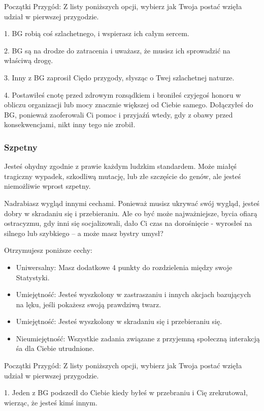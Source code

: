 Początki Przygód: Z listy poniższych opcji, wybierz jak Twoja postać wzięła udział w pierwszej przygodzie.

1. BG robią coś szlachetnego, i wspierasz ich całym sercem.

2. BG są na drodze do zatracenia i uważasz, że musisz ich sprowadzić na właściwą drogę.

3. Inny z BG zaprosił Ciędo przygody, słysząc o Twej szlachetnej naturze.

4. Postawiłeś cnotę przed zdrowym rozsądkiem i broniłeś czyjegoś honoru w obliczu organizacji lub mocy znacznie większej od Ciebie samego. Dołączyłeś do BG, ponieważ zaoferowali Ci pomoc i przyjaźń wtedy, gdy z obawy przed konsekwencjami, nikt inny tego nie zrobił.

\subsubsection{Szpetny}

Jesteś ohydny zgodnie z prawie każdym ludzkim standardem. Może miałęś tragiczny wypadek, szkodliwą mutację, lub złe szczęście do genów, ale jesteś niemożliwie wprost szpetny.

Nadrabiasz wygląd innymi cechami. Ponieważ musisz ukrywać swój wygląd, jesteś dobry w skradaniu się i przebieraniu. Ale co być może najważniejsze, bycia ofiarą ostracyzmu, gdy inni się socjalizowali, dało Ci czas na dorośnięcie  - wyrosłeś na silnego lub szybkiego – a może masz bystry umysł? 

Otrzymujesz poniższe cechy:
\begin{itemize}
    \item  Uniwersalny: Masz dodatkowe 4 punkty do rozdzielenia między swoje Statystyki.
    \item  Umiejętność: Jesteś wyszkolony w zastraszaniu i innych akcjach bazujących na lęku, jeśli pokażesz swoją prawdziwą twarz.
    \item  Umiejętność: Jesteś wyszkolony w skradaniu się i przebieraniu się.
    \item  Nieumiejętność: Wszystkie zadania związane z przyjemną społeczną interakcją śa dla Ciebie utrudnione.
\end{itemize}    

Początki Przygód: Z listy poniższych opcji, wybierz jak Twoja postać wzięła udział w pierwszej przygodzie.

1. Jeden z BG podszedł do Ciebie kiedy byłeś w przebraniu i Cię zrekrutował, wierząc, że jesteś kimś innym.

